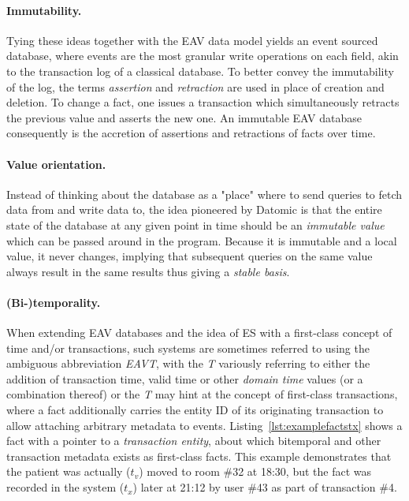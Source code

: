 \paragraph{Immutability.} Tying these ideas together with the EAV data model yields an event sourced database, where events are the most granular write operations on each field, akin to the transaction log of a classical database. To better convey the immutability of the log, the terms \emph{assertion} and \emph{retraction} are used in place of creation and deletion. To change a fact, one issues a transaction which simultaneously retracts the previous value and asserts the new one. An immutable EAV database consequently is the accretion of assertions and retractions of facts over time.

\paragraph{Value orientation.} Instead of thinking about the database as a "place" where to send queries to fetch data from and write data to, the idea pioneered by Datomic is that the entire state of the database at any given point in time should be an \emph{immutable value} which can be passed around in the program. Because it is immutable and a local value, it never changes, implying that subsequent queries on the same value always result in the same results thus giving a \emph{stable basis}.

\cleardoublepage
\paragraph{(Bi-)temporality.}

When extending EAV databases and the idea of \gls{ES} with a first-class concept of time and/or transactions, such systems are sometimes referred to using the ambiguous abbreviation \emph{EAVT}, with the \emph{T} variously referring to either the addition of transaction time, valid time or other \emph{domain time} values (or a combination thereof) \cite{huser2013desiderata} or the \emph{T} may hint at the concept of first-class transactions, where a fact additionally carries the entity ID of its originating transaction to allow attaching arbitrary metadata to events. Listing~\ref{lst:examplefactstx} shows a fact with a pointer to a \emph{transaction entity}, about which bitemporal and other transaction metadata exists as first-class facts. This example demonstrates that the patient was actually ($t_v$) moved to room \#32 at 18:30, but the fact was recorded in the system ($t_x$) later at 21:12 by user \#43 as part of transaction \#4.

